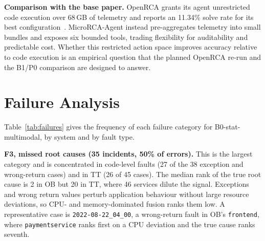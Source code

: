 \documentclass[conference]{IEEEtran}
\begin{document}
\textbf{Comparison with the base paper.}\label{sec:related-compare} OpenRCA grants its agent unrestricted code execution over 68\,GB of telemetry and reports an 11.34\% solve rate for its best configuration~\cite{xu2025openrca}. MicroRCA-Agent instead pre-aggregates telemetry into small bundles and exposes six bounded tools, trading flexibility for auditability and predictable cost. Whether this restricted action space improves accuracy relative to code execution is an empirical question that the planned OpenRCA re-run and the B1/P0 comparison are designed to answer.

\section{Failure Analysis}\label{sec:failures}

Table~\ref{tab:failures} gives the frequency of each failure category for B0-stat-multimodal, by system and by fault type.

\begin{table}[t]
\centering
\caption{Outcome categories of B0-stat-multimodal (counts of incidents). F1: top-1 is a direct neighbour of the root cause; F2: root cause in top-5 otherwise; F3: root cause ranked below fifth.}
\label{tab:failures}
\footnotesize
\setlength{\tabcolsep}{4pt}
\end{table}

\textbf{F3, missed root causes (35 incidents, 50\% of errors).} This is the largest category and is concentrated in code-level faults (27 of the 38 exception and wrong-return cases) and in TT (26 of 45 cases). The median rank of the true root cause is 2 in OB but 20 in TT, where 46 services dilute the signal. Exceptions and wrong return values perturb application behaviour without large resource deviations, so CPU- and memory-dominated fusion ranks them low. A representative case is \texttt{2022-08-22\_04\_00}, a wrong-return fault in OB's \texttt{frontend}, where \texttt{paymentservice} ranks first on a CPU deviation and the true cause ranks seventh.
\end{document}
